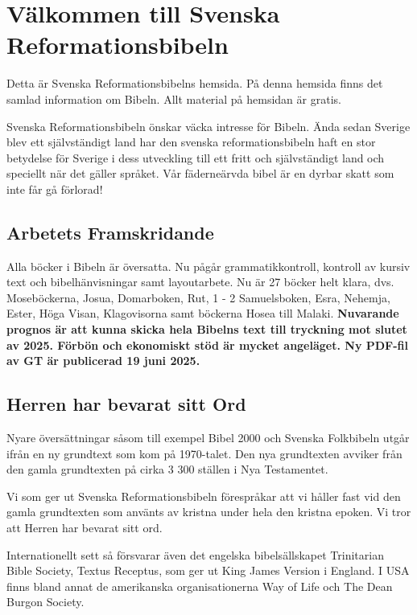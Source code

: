 \section*{Välkommen till Svenska Reformationsbibeln}

Detta är Svenska Reformationsbibelns hemsida. På denna hemsida finns det samlad information om Bibeln. Allt material på hemsidan är gratis.

Svenska Reformationsbibeln önskar väcka intresse för Bibeln. Ända sedan Sverige blev ett självständigt land har den svenska reformationsbibeln haft en stor betydelse för Sverige i dess utveckling till ett fritt och självständigt land och speciellt när det gäller språket. Vår fäderneärvda bibel är en dyrbar skatt som inte får gå förlorad!

\subsection*{Arbetets Framskridande}

Alla böcker i Bibeln är översatta. Nu pågår grammatikkontroll, kontroll av kursiv text och bibelhänvisningar samt layoutarbete. Nu är 27 böcker helt klara, dvs. Moseböckerna, Josua, Domarboken, Rut, 1 - 2 Samuelsboken, Esra, Nehemja, Ester, Höga Visan, Klagovisorna samt böckerna Hosea till Malaki. \textbf{Nuvarande prognos är att kunna skicka hela Bibelns text till tryckning mot slutet av 2025. Förbön och ekonomiskt stöd är mycket angeläget. Ny PDF-fil av GT är publicerad 19 juni 2025.}


\subsection*{Herren har bevarat sitt Ord}

Nyare översättningar såsom till exempel Bibel 2000 och Svenska Folkbibeln utgår ifrån en ny grundtext som kom på 1970-talet. Den nya grundtexten avviker från den gamla grundtexten på cirka 3 300 ställen i Nya Testamentet.

Vi som ger ut Svenska Reformationsbibeln förespråkar att vi håller fast vid den gamla grundtexten som använts av kristna under hela den kristna epoken. Vi tror att Herren har bevarat sitt ord.

Internationellt sett så försvarar även det engelska bibelsällskapet Trinitarian Bible Society, Textus Receptus, som ger ut King James Version i England. I USA finns bland annat de amerikanska organisationerna Way of Life och The Dean Burgon Society.

